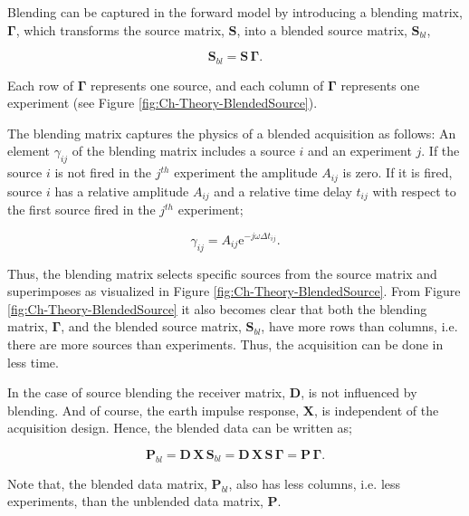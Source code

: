 Blending can be captured in the forward model by introducing a blending matrix, $\mathbf{\Gamma}$, which transforms the source matrix, $\mathbf{S}$, into a blended source matrix, $\mathbf{S}_{bl}$,

\begin{equation}
	\mathbf{S}_{bl} = \mathbf{S \, \Gamma}.
	\label{eq:Ch-Theory-BlendedSource}
\end{equation}

 Each row of $\mathbf{\Gamma}$ represents one source, and each column of $\mathbf{\Gamma}$ represents one experiment (see Figure \ref{fig:Ch-Theory-BlendedSource}). 
 
 The blending matrix captures the physics of a blended acquisition as follows: An element $\gamma_{ij}$ of the blending matrix includes a source $i$ and an experiment $j$. If the source $i$ is not fired in the $j^{th}$ experiment the amplitude $A_{ij}$ is zero. If it is fired, source $i$ has a relative amplitude $A_{ij}$ and a relative time delay $t_{ij}$ with respect to the first source fired in the $j^{th}$ experiment;

\begin{equation}
	\gamma_{ij} =  A_{ij} \mathrm{e}^{-j \omega \Delta t_{ij}}.
	\label{eq:Ch-Theory-BlendingElement}
\end{equation}  
 
Thus, the blending matrix selects specific sources from the source matrix and superimposes as visualized in Figure \ref{fig:Ch-Theory-BlendedSource}. From Figure \ref{fig:Ch-Theory-BlendedSource} it also becomes clear that both the blending matrix, $\mathbf{\Gamma}$, and the blended source matrix, $\mathbf{S}_{bl}$, have more rows than columns, i.e. there are more sources than experiments. Thus, the acquisition can be done in less time.

In the case of source blending the receiver matrix, $\mathbf{D}$, is not influenced by blending. And of course, the earth impulse response, $\mathbf{X}$, is independent of the acquisition design. Hence, the blended data can be written as;

\begin{equation}
	\mathbf{P}_{bl} = \mathbf{D} \, \mathbf{X} \, \mathbf{S}_{bl} = \mathbf{D} \, \mathbf{X} \, \mathbf{S} \, \mathbf{\Gamma} = \mathbf{P \, \Gamma}.
	\label{eq:Ch-Theory-BlendedData}
\end{equation}

Note that, the blended data matrix, $\mathbf{P}_{bl}$, also has less columns, i.e. less experiments, than the unblended data matrix, $\mathbf{P}$.



